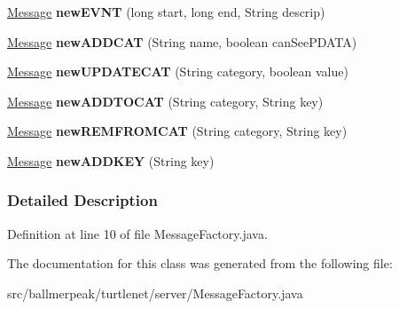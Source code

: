 \begin{DoxyCompactItemize}
\item 
\hypertarget{classballmerpeak_1_1turtlenet_1_1server_1_1MessageFactory_aec8e8561f1583c781f5bb11719def583}{\hyperlink{classballmerpeak_1_1turtlenet_1_1shared_1_1Message}{Message} {\bfseries new\-E\-V\-N\-T} (long start, long end, String descrip)}\label{classballmerpeak_1_1turtlenet_1_1server_1_1MessageFactory_aec8e8561f1583c781f5bb11719def583}

\item 
\hypertarget{classballmerpeak_1_1turtlenet_1_1server_1_1MessageFactory_ac31e65610f9ec3966639894fb47d7afc}{\hyperlink{classballmerpeak_1_1turtlenet_1_1shared_1_1Message}{Message} {\bfseries new\-A\-D\-D\-C\-A\-T} (String name, boolean can\-See\-P\-D\-A\-T\-A)}\label{classballmerpeak_1_1turtlenet_1_1server_1_1MessageFactory_ac31e65610f9ec3966639894fb47d7afc}

\item 
\hypertarget{classballmerpeak_1_1turtlenet_1_1server_1_1MessageFactory_ac9f69e89c9075dbc495aea39161fbdc4}{\hyperlink{classballmerpeak_1_1turtlenet_1_1shared_1_1Message}{Message} {\bfseries new\-U\-P\-D\-A\-T\-E\-C\-A\-T} (String category, boolean value)}\label{classballmerpeak_1_1turtlenet_1_1server_1_1MessageFactory_ac9f69e89c9075dbc495aea39161fbdc4}

\item 
\hypertarget{classballmerpeak_1_1turtlenet_1_1server_1_1MessageFactory_afd84179b0e98eec0fc3a04baec495de8}{\hyperlink{classballmerpeak_1_1turtlenet_1_1shared_1_1Message}{Message} {\bfseries new\-A\-D\-D\-T\-O\-C\-A\-T} (String category, String key)}\label{classballmerpeak_1_1turtlenet_1_1server_1_1MessageFactory_afd84179b0e98eec0fc3a04baec495de8}

\item 
\hypertarget{classballmerpeak_1_1turtlenet_1_1server_1_1MessageFactory_a0fd9519783f42df00f70246ac3101a01}{\hyperlink{classballmerpeak_1_1turtlenet_1_1shared_1_1Message}{Message} {\bfseries new\-R\-E\-M\-F\-R\-O\-M\-C\-A\-T} (String category, String key)}\label{classballmerpeak_1_1turtlenet_1_1server_1_1MessageFactory_a0fd9519783f42df00f70246ac3101a01}

\item 
\hypertarget{classballmerpeak_1_1turtlenet_1_1server_1_1MessageFactory_ad66a61b31e19d8c49af33bc6ebe4ff13}{\hyperlink{classballmerpeak_1_1turtlenet_1_1shared_1_1Message}{Message} {\bfseries new\-A\-D\-D\-K\-E\-Y} (String key)}\label{classballmerpeak_1_1turtlenet_1_1server_1_1MessageFactory_ad66a61b31e19d8c49af33bc6ebe4ff13}

\end{DoxyCompactItemize}


\subsubsection{Detailed Description}


Definition at line 10 of file Message\-Factory.\-java.



The documentation for this class was generated from the following file\-:\begin{DoxyCompactItemize}
\item 
src/ballmerpeak/turtlenet/server/Message\-Factory.\-java\end{DoxyCompactItemize}
